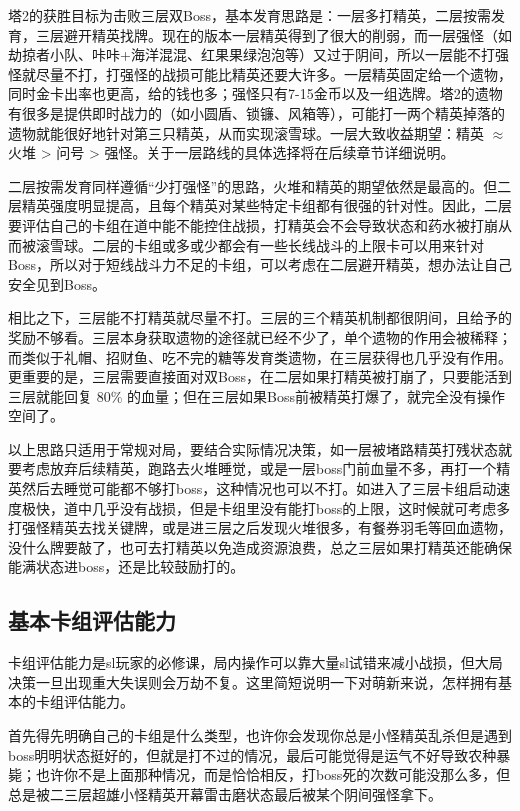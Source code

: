 ﻿\documentclass[12pt, a4paper]{article}
\begin{document}
塔2的获胜目标为击败三层双Boss，基本发育思路是：一层多打精英，二层按需发育，三层避开精英找牌。现在的版本一层精英得到了很大的削弱，而一层强怪（如劫掠者小队、咔咔+海洋混混、红果果绿泡泡等）又过于阴间，所以一层能不打强怪就尽量不打，打强怪的战损可能比精英还要大许多。一层精英固定给一个遗物，同时金卡出率也更高，给的钱也多；强怪只有7-15金币以及一组选牌。塔2的遗物有很多是提供即时战力的（如小圆盾、锁镰、风箱等），可能打一两个精英掉落的遗物就能很好地针对第三只精英，从而实现滚雪球。一层大致收益期望：精英 $\approx$ 火堆 \textgreater{} 问号 \textgreater{} 强怪。关于一层路线的具体选择将在后续章节详细说明。

二层按需发育同样遵循“少打强怪”的思路，火堆和精英的期望依然是最高的。但二层精英强度明显提高，且每个精英对某些特定卡组都有很强的针对性。因此，二层要评估自己的卡组在道中能不能控住战损，打精英会不会导致状态和药水被打崩从而被滚雪球。二层的卡组或多或少都会有一些长线战斗的上限卡可以用来针对Boss，所以对于短线战斗力不足的卡组，可以考虑在二层避开精英，想办法让自己安全见到Boss。

相比之下，三层能不打精英就尽量不打。三层的三个精英机制都很阴间，且给予的奖励不够看。三层本身获取遗物的途径就已经不少了，单个遗物的作用会被稀释；而类似于礼帽、招财鱼、吃不完的糖等发育类遗物，在三层获得也几乎没有作用。更重要的是，三层需要直接面对双Boss，在二层如果打精英被打崩了，只要能活到三层就能回复 80\% 的血量；但在三层如果Boss前被精英打爆了，就完全没有操作空间了。

以上思路只适用于常规对局，要结合实际情况决策，如一层被堵路精英打残状态就要考虑放弃后续精英，跑路去火堆睡觉，或是一层boss门前血量不多，再打一个精英然后去睡觉可能都不够打boss，这种情况也可以不打。如进入了三层卡组启动速度极快，道中几乎没有战损，但是卡组里没有能打boss的上限，这时候就可考虑多打强怪精英去找关键牌，或是进三层之后发现火堆很多，有餐券羽毛等回血遗物，没什么牌要敲了，也可去打精英以免造成资源浪费，总之三层如果打精英还能确保能满状态进boss，还是比较鼓励打的。

\subsection{基本卡组评估能力}
卡组评估能力是sl玩家的必修课，局内操作可以靠大量sl试错来减小战损，但大局决策一旦出现重大失误则会万劫不复。这里简短说明一下对萌新来说，怎样拥有基本的卡组评估能力。

首先得先明确自己的卡组是什么类型，也许你会发现你总是小怪精英乱杀但是遇到boss明明状态挺好的，但就是打不过的情况，最后可能觉得是运气不好导致农种暴毙；也许你不是上面那种情况，而是恰恰相反，打boss死的次数可能没那么多，但总是被二三层超雄小怪精英开幕雷击磨状态最后被某个阴间强怪拿下。
\end{document}

